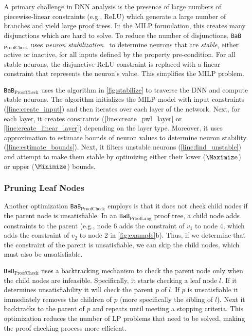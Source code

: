 \documentclass[oneside,11pt,dvipsnames]{book}
\newcommand{\prooflang}{\texttt{BaB$_{\text{ProofLang}}$}}
\newcommand{\proofcheck}{\texttt{BaB$_{\text{ProofCheck}}$}}
\begin{document}
A primary challenge in DNN analysis is the presence of large numbers of piecewise-linear constraints (e.g., ReLU) which generate a large number of branches and yield large proof trees. In the MILP formulation, this creates many disjunctions which are hard to solve. To reduce the number of disjunctions, \proofcheck{} uses \emph{neuron stabilization}~\cite{duong2024harnessing}
to determine neurons that are \emph{stable}, either active or inactive, for all inputs defined by the property pre-condition.
For all stable neurons, the disjunctive ReLU constraint is replaced with a linear constraint that represents the neuron's value.   This simplifies the MILP problem.

\proofcheck{} uses the algorithm in \autoref{fig:stabilize} to traverse the DNN and compute stable neurons. The algorithm initializes the MILP model with input constraints (\autoref{line:create_input}) and then iterates over each layer of the network. 
Next, for each layer, it creates constraints (\autoref{line:create_pwl_layer} or \autoref{line:create_linear_layer}) depending on the layer type.
Moreover,  it uses approximation to estimate bounds of neuron values to determine neuron stability (\autoref{line:estimate_bounds}).
Next, it filters unstable neurons (\autoref{line:find_unstable}) and attempt to make them stable by optimizing either their lower ($\Maximize$) or upper ($\Minimize$) bounds.



\subsubsection{Pruning Leaf Nodes}\label{sec:pruning}

Another optimization \proofcheck{} employs is that it does not check child nodes if the parent node is unsatisfiable.
In an \prooflang{} proof tree, a child node adds constraints to the parent (e.g., node 6 adds the constraint of $v_1$ to node 4, which adds the constraint of $v_2$ to node 2 in \autoref{fig:example}b). Thus, if we determine that the constraint of the parent is unsatisfiable, we can skip the child nodes, which must also be unsatisfiable.  


\proofcheck{} uses a backtracking mechanism to check the parent node only when the child nodes are infeasible. Specifically, it starts checking a leaf node $l$. If it determines unsatisfiability it will check the parent $p$ of $l$. If $p$ is unsatisfiable it immediately removes the children of $p$ (more specifically the sibling of $l$). Next it backtracks to the parent of $p$ and repeats until meeting a stopping criteria. This optimization reduces the number of LP problems that need to be solved, making the proof checking process more efficient. 
\end{document}
